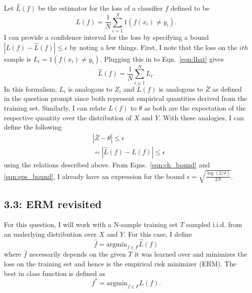 \documentclass[12pt]{amsart}
\begin{document}
Let $\hat{L}(f)$ be the estimator for the loss of a classifier $f$ defined to be
\begin{equation} \label{eqn:lhat}
\hat{L}(f) = \frac{1}{N} \sum_{i = 1}^N 1(f(x_i) \neq y_i).
\end{equation}
I can provide a confidence interval for the loss by specifying a bound $|L(f) - \hat{L}(f)| \leq \epsilon$ by noting a few things.  First, I note that the loss on the $ith$ sample is $L_i = 1(f(x_i) \neq y_i)$.  Plugging this in to Eqn.~\ref{eqn:lhat} gives
\begin{equation}
\hat{L}(f) = \frac{1}{N} \sum_{i = 1}^N L_i.
\end{equation}
In this formalism, $L_i$ is analogous to $Z_i$ and $\hat{L}(f)$ is analogous to $\bar{Z}$ as defined in the question prompt since both represent empirical quantities derived from the training set.  Similarly, I can relate $L(f)$ to $\theta$ as both are the expectation of the respective quantity over the distribution of $X$ and $Y$.  With these analogies, I can define the following
\begin{equation}
\begin{split}
& |\bar{Z} - \theta | \leq \epsilon \\
& = |\hat{L}(f) - L(f) | \leq \epsilon
\end{split}
\end{equation}
using the relations described above.  From Eqns.~\ref{eqn:ch_bound} and \ref{eqn:eps_bound}, I already have an expression for the bound $\epsilon = \sqrt{\frac{\log(2/\delta)}{2N}}$. 

\subsection*{3.3: ERM revisited}

For this question, I will work with a N-sample training set $T$ sampled i.i.d. from an underlying distribution over $X$ and $Y$.  For this case, I define 
\begin{equation} \label{eqn:fhat}
\hat{f} = \text{argmin}_{f \in F}\hat{L}(f)
\end{equation}
where $\hat{f}$ necessarily depends on the given $T$ it was learned over and minimizes the loss on the training set and hence is the empirical risk minimizer (ERM).  The best in class function is defined as
\begin{equation} \label{eqn:fstar}
f^* = \text{argmin}_{f \in F}L(f).
\end{equation}
\end{document}
